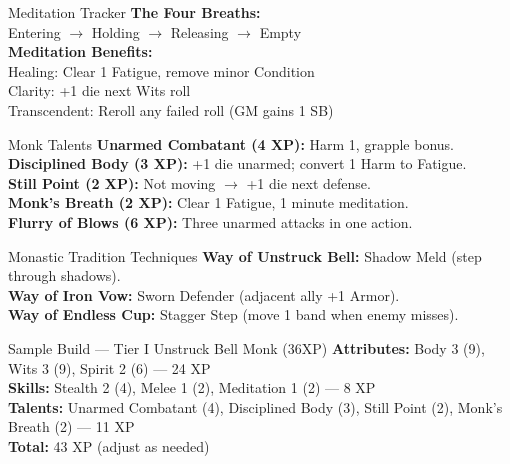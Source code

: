 \documentclass[10pt]{article}
\begin{document}
\begin{minipage}[t]{0.48\linewidth}
    \vspace{0.5em}
    
    \begin{charbox}{Meditation Tracker}
        \textbf{The Four Breaths:}\\
        Entering $\rightarrow$ Holding $\rightarrow$ Releasing $\rightarrow$ Empty\\
        \textbf{Meditation Benefits:}\\
        Healing: Clear 1 Fatigue, remove minor Condition\\
        Clarity: +1 die next Wits roll\\
        Transcendent: Reroll any failed roll (GM gains 1 SB)
    \end{charbox}
\end{minipage}
\hfill
\begin{minipage}[t]{0.48\linewidth}
    \begin{charbox}{Monk Talents}
        \textbf{Unarmed Combatant (4 XP):} Harm 1, grapple bonus.\\
        \textbf{Disciplined Body (3 XP):} +1 die unarmed; convert 1 Harm to Fatigue.\\
        \textbf{Still Point (2 XP):} Not moving $\rightarrow$ +1 die next defense.\\
        \textbf{Monk's Breath (2 XP):} Clear 1 Fatigue, 1 minute meditation.\\
        \textbf{Flurry of Blows (6 XP):} Three unarmed attacks in one action.
    \end{charbox}
    
    \vspace{0.5em}
    
    \begin{charbox}{Monastic Tradition Techniques}
        \textbf{Way of Unstruck Bell:} Shadow Meld (step through shadows).\\
        \textbf{Way of Iron Vow:} Sworn Defender (adjacent ally +1 Armor).\\
        \textbf{Way of Endless Cup:} Stagger Step (move 1 band when enemy misses).
    \end{charbox}
    
    \vspace{0.5em}
    
    \begin{charbox}{Sample Build --- Tier I Unstruck Bell Monk (36XP)}
        \textbf{Attributes:} Body 3 (9), Wits 3 (9), Spirit 2 (6) --- 24 XP\\
        \textbf{Skills:} Stealth 2 (4), Melee 1 (2), Meditation 1 (2) --- 8 XP\\
        \textbf{Talents:} Unarmed Combatant (4), Disciplined Body (3), Still Point (2), Monk's Breath (2) --- 11 XP\\
        \textbf{Total:} 43 XP (adjust as needed)
    \end{charbox}
\end{minipage}
\end{document}

